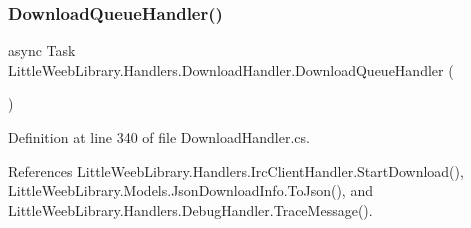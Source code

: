 \subsubsection{\texorpdfstring{Download\+Queue\+Handler()}{DownloadQueueHandler()}}
{\footnotesize\ttfamily async Task Little\+Weeb\+Library.\+Handlers.\+Download\+Handler.\+Download\+Queue\+Handler (\begin{DoxyParamCaption}{ }\end{DoxyParamCaption})\hspace{0.3cm}{\ttfamily [private]}}



Definition at line 340 of file Download\+Handler.\+cs.



References Little\+Weeb\+Library.\+Handlers.\+Irc\+Client\+Handler.\+Start\+Download(), Little\+Weeb\+Library.\+Models.\+Json\+Download\+Info.\+To\+Json(), and Little\+Weeb\+Library.\+Handlers.\+Debug\+Handler.\+Trace\+Message().



